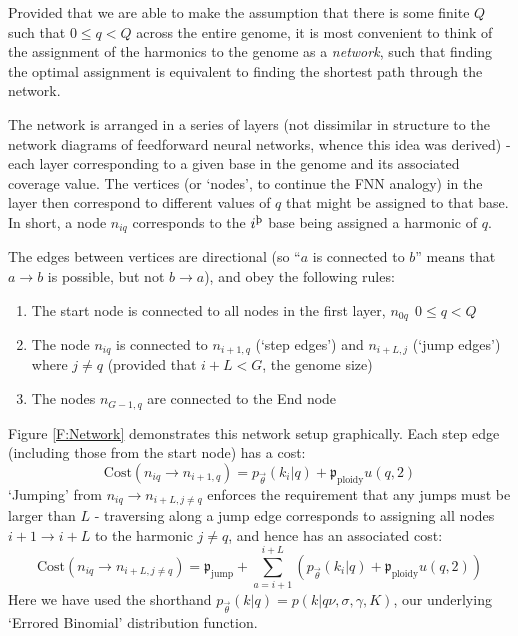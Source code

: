 \documentclass[fleqn,usenatbib]{mnras}
\begin{document}

				Provided that we are able to make the assumption that there is some finite $Q$ such that $0 \leq q < Q$ across the entire genome, it is most convenient to think of the assignment of the harmonics to the genome as a \textit{network}, such that finding the optimal assignment is equivalent to finding the shortest path through the network.

				The network is arranged in a series of layers (not dissimilar in structure to the network diagrams of feedforward neural networks, whence this idea was derived) - each layer corresponding to a given base in the genome and its associated coverage value. The vertices (or `nodes', to continue the FNN analogy) in the layer then correspond to different values of $q$ that might be assigned to that base. In short, a node $n_{iq}$ corresponds to the $i^\text{\th}$ base being assigned a harmonic of $q$.

				The edges between vertices are directional (so ``$a$ is connected to $b$'' means that $a\to b$ is possible, but not $b\to a$), and obey the following rules:
				\begin{enumerate}
					\item The start node is connected to all nodes in the first layer, $n_{0q}~~ 0 \leq q < Q$ 
					\item The node $n_{iq}$ is connected to $n_{i+1,q}$ (`step edges') and $n_{i+L,j}$ (`jump edges') where $j\neq q$ (provided that $i + L < G$, the genome size)
					\item The nodes $n_{G-1,q}$ are connected to the End node
				\end{enumerate}

				Figure \ref{F:Network} demonstrates this network setup graphically. Each step edge (including those from the start node) has a cost:
				\begin{equation}
					\text{Cost}(n_{iq} \to n_{i+1,q}) = p_{\vec{\theta}}(k_i | q) + \mathfrak{p}_\text{ploidy} u(q,2)
				\end{equation}
				`Jumping' from $n_{iq} \to n_{i+L,j\neq q}$ enforces the requirement that any jumps must be larger than $L$ - traversing along a jump edge corresponds to assigning all nodes $i+1 \to i+L$ to the harmonic $j\neq q$, and hence has an associated cost:
				\begin{equation}
					\text{Cost}(n_{iq} \to n_{i+L,j\neq q}) = \mathfrak{p}_\text{jump} + \sum_{a = i+1}^{i+L} \left( p_{\vec{\theta}}(k_i | q)+ \mathfrak{p}_\text{ploidy} u(q,2) \right)
				\end{equation}
				Here we have used the shorthand $p_{\vec{\theta}}(k|q) = p(k| q\nu, \sigma,\gamma,K)$, our underlying `Errored Binomial' distribution function.
\end{document}
